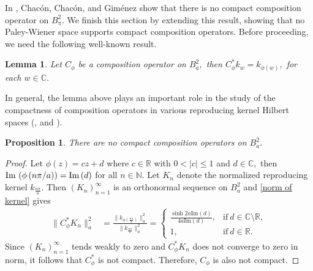 \documentclass[11pt]{amsart}%
\numberwithin{equation}{section}
\theoremstyle{plain}
\newtheorem{lem}[thm]{Lemma}
\newtheorem{prop}[thm]{Proposition}
\theoremstyle{definition}
\theoremstyle{definition}
\newcommand{\im}{{\rm Im}\,}
\begin{document}
In  \cite[Corollary~2.5]{Chacon}, Chac\'on, Chac\'on, and Gim\'enez show that there is no compact composition operator on $B^2_{\pi}.$ We finish this section by extending this result, showing that no Paley-Wiener space supports compact composition operators. Before proceeding, we need the following well-known result.

\begin{lem}\label{adjoint}Let $C_{\phi}$ be a composition operator on $B^2_a,$ then  $C_{\phi}^*k_w=k_{\phi(w)},$ for each $w\in \mathbb{C}.$ 
\end{lem}

In general, the lemma above plays an important role in the study of the compactness of composition operators in various reproducing kernel Hilbert spaces (\cite[Proposition 3.13]{Cowen}, \cite[Corollary 3.3]{Elliot} and \cite[page 43]{Shapiro}). 





\begin{prop}\label{compactness} There are no compact composition operators on $B^2_a.$
\end{prop}
\begin{proof}  Let $\phi(z)=cz+d$ where $c\in \mathbb{R}$ with $0<|c|\leq 1$ and $d\in \mathbb{C},$ then $\im \left(\phi \left(n\pi/a\right)\right)=\im (d)$ for all $n\in \mathbb{N}.$ Let $K_n$ denote the normalized reproducing kernel $k_{\frac{n\pi}{a}}.$ Then $(K_n)_{n=1}^{\infty}$ is an orthonormal sequence on $B^2_a$ and \eqref{norm of kernel} gives
\begin{align*}
\|C_{\phi}^*K_n\|_{a}^{2}&=\frac{\|k_{\phi(\frac{n\pi}{a})}\|^{2}_{a}}{\|k_{\frac{n\pi}{a}}\|^{2}_{a}}=\begin{cases}\displaystyle\frac{\operatorname{sinh}2a\mathrm{Im}(d)}{4a\mathrm{Im}(d)}, & \text{if}\ d\in \mathbb{C}\setminus\mathbb{R}, \\ 
1, & \text{if}\  d\in \mathbb{R}.
\end{cases}
\end{align*}
 Since $(K_n)_{n=1}^{\infty}$ tends weakly to zero and $C_{\phi}^*K_n$ does not converge to zero in norm, it follows that $C_{\phi}^*$ is not compact. Therefore, $C_{\phi}$ is also not compact.
\end{proof}
\end{document}
